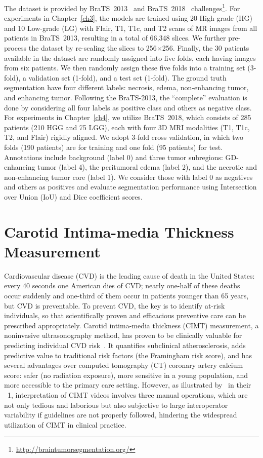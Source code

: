 The dataset is provided by BraTS~2013~\citep{kistler2013virtual} and BraTS~2018~\citep{menze2015multimodal,bakas2018identifying} challenges\footnote{\href{http://braintumorsegmentation.org/}{http://braintumorsegmentation.org/}}. For experiments in Chapter~\ref{ch3}, the models are trained using 20 High-grade (HG) and 10 Low-grade (LG) with Flair, T1, T1c, and T2 scans of MR images from all patients in BraTS~2013, resulting in a total of 66,348 slices. We further pre-process the dataset by re-scaling the slices to 256$\times$256. Finally, the  30 patients available in the dataset are randomly assigned into five folds, each having images from six patients. We then randomly assign these five folds into a training set (3-fold), a validation set (1-fold), and a test set (1-fold). The ground truth segmentation have four different labels: necrosis, edema, non-enhancing tumor, and enhancing tumor. Following the BraTS-2013, the ``complete'' evaluation is done by considering all four labels as positive class and others as negative class. For experiments in Chapter~\ref{ch4}, we utilize BraTS~2018, which consists of 285 patients (210 HGG and 75 LGG), each with four 3D MRI modalities (T1, T1c, T2, and Flair) rigidly aligned. We adopt 3-fold cross validation, in which two folds (190 patients) are for training and one fold (95 patients) for test. Annotations include background (label 0) and three tumor subregions: GD-enhancing tumor (label 4), the peritumoral edema (label 2), and the necrotic and non-enhancing tumor core (label 1). We consider those with label 0 as negatives and others as positives and evaluate segmentation performance using Intersection over Union (IoU) and Dice coefficient scores.


\section*{Carotid Intima-media Thickness Measurement}
\label{ap1:cimt_measurement}

Cardiovascular disease (CVD) is the leading cause of death in the United States: every 40 seconds one American dies of CVD; nearly one-half of these deaths occur suddenly and one-third of them occur in patients younger than 65 years, but CVD is preventable. To prevent CVD, the key is to identify at-risk individuals, so that scientifically proven and efficacious preventive care can be prescribed appropriately. Carotid intima-media thickness (CIMT) measurement, a noninvasive ultrasonography method, has proven to be clinically valuable for predicting individual CVD risk~\citep{stein2008use,gepner2015comparison}. It quantifies subclinical atherosclerosis, adds predictive value to traditional risk factors (\eg the Framingham risk score), and has several advantages over computed tomography (CT) coronary artery calcium score: safer (no radiation exposure), more sensitive in a young population, and more accessible to the primary care setting.  However, as illustrated by~\citet{shin2016automating} in their \figurename~1, interpretation of CIMT videos involves three manual operations, which are not only tedious and laborious but also subjective to large interoperator variability if guidelines are not properly followed, hindering the widespread utilization of CIMT in clinical practice. 

